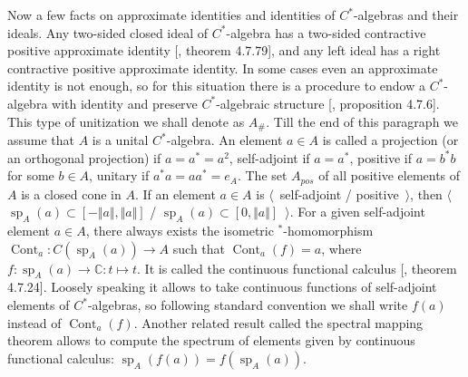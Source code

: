 Now a few facts on approximate identities and identities of $C^*$-algebras and their ideals. Any two-sided closed ideal of $C^*$-algebra has a two-sided contractive positive approximate identity [\cite{HelBanLocConvAlg}, theorem 4.7.79], and any left ideal has a right contractive positive approximate identity. In some cases even an approximate identity is not enough, so for this situation there is a procedure to endow a $C^*$-algebra with identity and preserve $C^*$-algebraic structure [\cite{HelBanLocConvAlg}, proposition 4.7.6]. This type of unitization we shall denote as $A_\#$. Till the end of this paragraph we assume that $A$ is a unital $C^*$-algebra. An element $a\in A$ is called a projection (or an orthogonal projection) if $a=a^*=a^2$, self-adjoint if $a=a^*$, positive if $a=b^*b$ for some $b\in A$, unitary if $a^*a=aa^*=e_A$. The set $A_{pos}$ of all positive elements of $A$ is a closed cone in $A$. If an element $a\in A$ is $\langle$~self-adjoint / positive~$\rangle$, then $\langle$~$\operatorname{sp}_A(a)\subset[-\Vert a\Vert, \Vert a\Vert]$ / $\operatorname{sp}_A(a)\subset[0,\Vert a\Vert]$~$\rangle$. For a given self-adjoint element $a\in A$, there always exists the isometric ${}^*$-homomorphism $\operatorname{Cont}_a:C(\operatorname{sp}_A(a))\to A$ such that $\operatorname{Cont}_a(f)=a$, where $f:\operatorname{sp}_A(a)\to\mathbb{C}:t\mapsto t$. It is called the continuous functional calculus [\cite{HelBanLocConvAlg}, theorem 4.7.24]. Loosely speaking it allows to take continuous functions of self-adjoint elements of $C^*$-algebras, so following standard convention we shall write $f(a)$ instead of $\operatorname{Cont}_a(f)$. Another related result called the spectral mapping theorem allows to compute the spectrum of elements given by continuous functional calculus: $\operatorname{sp}_A(f(a))=f(\operatorname{sp}_A(a))$.

